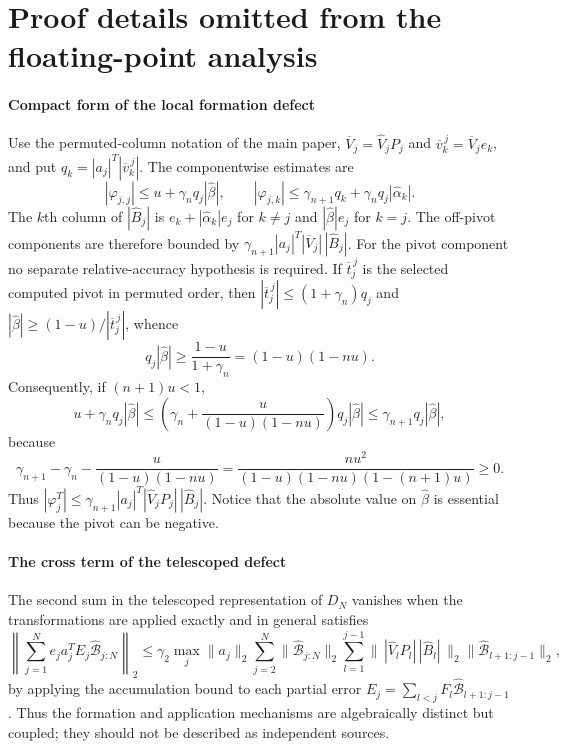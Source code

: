 \documentclass[supplement,review,onefignum,onetabnum]{siamart251216}
\begin{document}
\section{Proof details omitted from the floating-point analysis}
\label{sm:proofs}

\paragraph{Compact form of the local formation defect}
Use the permuted-column notation of the main paper,
$\overline V_j=\widehat V_jP_j$ and
$\overline v_k^{\,j}=\overline V_je_k$, and put
$q_k=|a_j|^T|\overline v_k^{\,j}|$. The componentwise estimates are
%
\[
|\varphi_{j,j}|
\le u+\gamma_n q_j|\hat\beta|,
\qquad
|\varphi_{j,k}|
\le\gamma_{n+1}q_k+\gamma_n q_j|\hat\alpha_k|.
\]
%
The $k$th column of $|\widehat B_j|$ is
$e_k+|\hat\alpha_k|e_j$ for $k\ne j$ and $|\hat\beta|e_j$ for $k=j$. The off-pivot
components are therefore bounded by
$\gamma_{n+1}|a_j|^T|\overline V_j|\,|\widehat B_j|$. For the pivot component no separate
relative-accuracy hypothesis is required. If
$\overline t_j^{\,j}$ is the selected computed pivot in permuted order, then
$|\overline t_j^{\,j}|\le(1+\gamma_n)q_j$ and
$|\hat\beta|\ge(1-u)/|\overline t_j^{\,j}|$, whence
%
\[
q_j|\hat\beta|\ge\frac{1-u}{1+\gamma_n}=(1-u)(1-nu).
\]
%
Consequently, if $(n+1)u<1$,
%
\[
u+\gamma_n q_j|\hat\beta|
\le
\left(\gamma_n+\frac{u}{(1-u)(1-nu)}\right)q_j|\hat\beta|
\le\gamma_{n+1}q_j|\hat\beta|,
\]
%
because
%
\[
\gamma_{n+1}-\gamma_n-
\frac{u}{(1-u)(1-nu)}
=
\frac{nu^2}{(1-u)(1-nu)(1-(n+1)u)}\ge0.
\]
%
Thus
$|\varphi_j^T|\le\gamma_{n+1}|a_j|^T|\widehat V_jP_j|\,|\widehat B_j|$.
Notice that the absolute value on $\hat\beta$ is essential because the pivot can be negative.

\paragraph{The cross term of the telescoped defect}
The second sum in the telescoped representation of $D_N$ vanishes when the transformations are
applied exactly and in general satisfies
%
\[
\left\|\sum_{j=1}^{N}e_j a_j^TE_j\widehat{\mathcal B}_{j:N}\right\|_2
\le
\gamma_2\max_j\|a_j\|_2
\sum_{j=2}^{N}\|\widehat{\mathcal B}_{j:N}\|_2
\sum_{l=1}^{j-1}
\bigl\|\,|\widehat V_lP_l|\,|\widehat B_l|\,\bigr\|_2
\|\widehat{\mathcal B}_{l+1:j-1}\|_2,
\]
%
by applying the accumulation bound to each partial error
$E_j=\sum_{l<j}F_l\widehat{\mathcal B}_{l+1:j-1}$. Thus the formation and application mechanisms
are algebraically distinct but coupled; they should not be described as independent sources.
\end{document}
